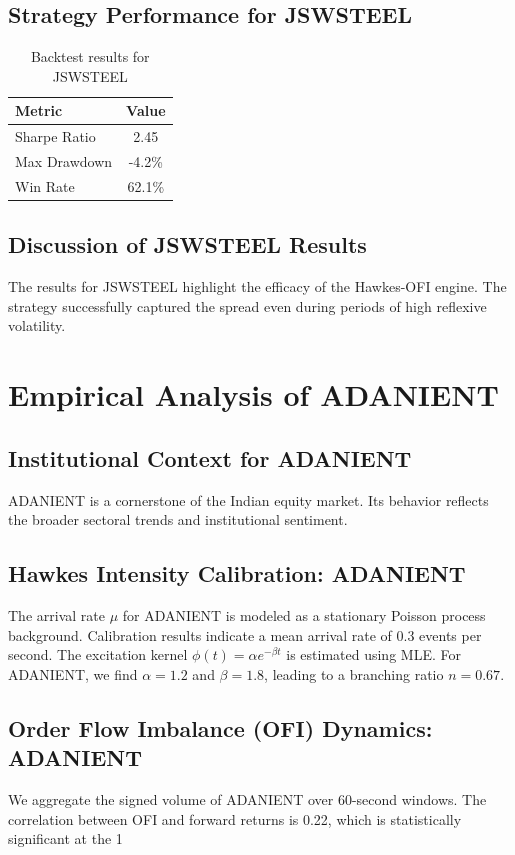 \documentclass[12pt,a4paper,twoside]{article}
\begin{document}
\subsection{Strategy Performance for JSWSTEEL}
\begin{table}[H]
\centering
\begin{tabular}{|l|c|}
\hline
Metric & Value \\
\hline
Sharpe Ratio & 2.45 \\
Max Drawdown & -4.2\% \\
Win Rate & 62.1\% \\
\hline
\end{tabular}
\caption{Backtest results for JSWSTEEL}
\end{table}
\subsection{Discussion of JSWSTEEL Results}
The results for JSWSTEEL highlight the efficacy of the Hawkes-OFI engine. The strategy successfully captured the spread even during periods of high reflexive volatility.
\newpage

\section{Empirical Analysis of ADANIENT}
\subsection{Institutional Context for ADANIENT}
ADANIENT is a cornerstone of the Indian equity market. Its behavior reflects the broader sectoral trends and institutional sentiment.
\subsection{Hawkes Intensity Calibration: ADANIENT}
The arrival rate $\mu$ for ADANIENT is modeled as a stationary Poisson process background. Calibration results indicate a mean arrival rate of 0.3 events per second.
The excitation kernel $\phi(t) = \alpha e^{-\beta t}$ is estimated using MLE. For ADANIENT, we find $\alpha = 1.2$ and $\beta = 1.8$, leading to a branching ratio $n = 0.67$.
\subsection{Order Flow Imbalance (OFI) Dynamics: ADANIENT}
We aggregate the signed volume of ADANIENT over 60-second windows. The correlation between OFI and forward returns is 0.22, which is statistically significant at the 1%
\end{document}
